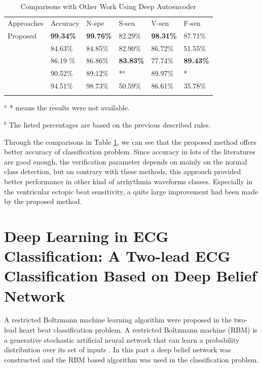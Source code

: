 \documentclass[graybox]{svmult}
\begin{document}
\begin{table}
\caption{Comparisons with Other Work Using Deep Autoencoder}
\label{tab:6}       %
%
%
\begin{tabular}{p{2.6cm}p{1.7cm}p{1.7cm}p{1.7cm}p{1.7cm}p{1.6cm}}
\hline\noalign{\smallskip}
 Approaches     &  Accuracy & N-spe & S-sen & V-sen & F-sen  \\
\noalign{\smallskip}\svhline\noalign{\smallskip}
Proposed             &  \textbf{99.34\%}  & \textbf{99.76\%} &  82.29\% & \textbf{98.31\%} & 87.71\% \\
 \citet{mar2011optimization}        &  84.63\%  & 84.85\% & 82.90\%  & 86.72\% & 51.55\% \\
 \citet{chaza}   &  86.19 \% & 86.86\% & \textbf{83.83\%}  & 77.74\% & \textbf{89.43\%} \\
 \citet{melgan} &   90.52\%  & 89.12\% & *$^a$    & 89.97\% & * \\
  \citet{jiang2007block}   &  94.51\%  & 98.73\% & 50.59\%  & 86.61\% & 35.78\% \\
\noalign{\smallskip}\hline\noalign{\smallskip}
\end{tabular}

$^a$ * means the results were not available.

$^b$ The listed percentages are based on the previous described rules.
\end{table}

Through the comparisons in Table \ref{tab:6}, we can see that the proposed method offers better accuracy of classification problem. Since accuracy in lots of the literatures are good enough, the verification parameter depends on mainly on the normal class detection, but on contrary with these methods, this approach provided better performance in other kind of arrhythmia waveforms classes. Especially in the ventricular ectopic beat sensitivity, a quite large improvement had been made by the proposed method.




\section{Deep Learning in ECG Classification: A Two-lead ECG Classification Based on Deep Belief Network}
A restricted Boltzmann machine learning algorithm were proposed in the two-lead heart beat classification problem. A restricted Boltzmann machine (RBM) is a generative stochastic artificial neural network that can learn a probability distribution over its set of inputs \citep{fischer2012introduction}. In this part a deep belief network was constructed and the RBM based algorithm was used in the classification problem. 
\end{document}
